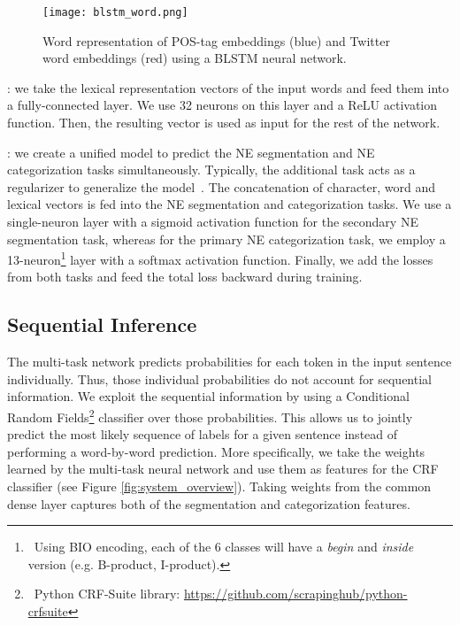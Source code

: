 \documentclass[11pt,letterpaper]{article}
\begin{document}
\begin{figure}
\centering
\texttt{[image: blstm\_word.png]}
\caption{ \small Word representation of POS-tag embeddings (blue) and Twitter word embeddings (red) using a BLSTM neural network. }
\label{fig:blstm_word}
\end{figure}

: we take the lexical representation vectors of the input words and feed them into a fully-connected layer. We use 32 neurons on this layer and a ReLU activation function. Then, the resulting vector is used as input for the rest of the network.

: we create a unified model to predict the NE segmentation and NE categorization tasks simultaneously. Typically, the additional task acts as a regularizer to generalize the model~\cite{goodfellow2016deep,collobert2008unified}. The concatenation of character, word and lexical vectors is fed into the NE segmentation and  categorization tasks. We use a single-neuron layer with a sigmoid activation function for the secondary NE segmentation task, whereas for the primary NE categorization task, we employ a 13-neuron\footnote{~Using BIO encoding, each of the 6 classes will have a \textit{begin} and \textit{inside} version (e.g. B-product, I-product).} layer with a softmax activation function. Finally, we add the losses from both tasks and feed the total loss backward during training.

\subsection{Sequential Inference} \label{crf}

The multi-task network predicts probabilities for each token in the input sentence individually. Thus, those individual probabilities do not account for sequential information. We exploit the sequential information by using a Conditional Random Fields\footnote{~Python CRF-Suite library: \url{https://github.com/scrapinghub/python-crfsuite}} classifier over those probabilities. This allows us to jointly predict the most likely sequence of labels for a given sentence instead of performing a word-by-word prediction. More specifically, we take the weights learned by the multi-task neural network and use them as features for the CRF classifier (see Figure \ref{fig:system_overview}). Taking weights from the common dense layer captures both of the segmentation and categorization features. 
\end{document}
